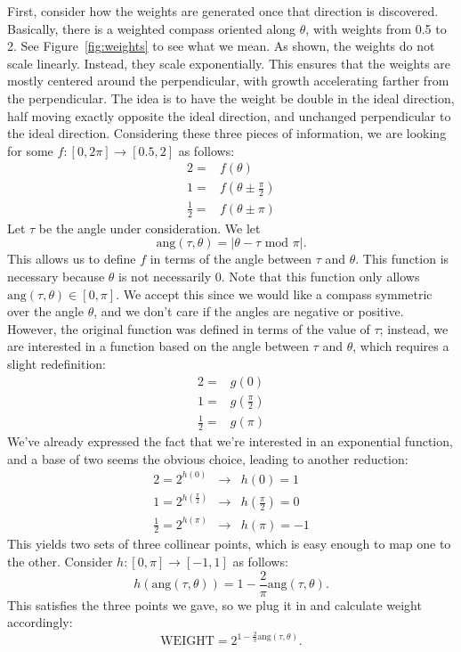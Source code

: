 \documentclass[twocolumn,11pt]{article}
\begin{document}
First, consider how the weights are generated once
that direction is discovered. Basically, there is a weighted compass oriented
along $\theta$, with weights from 0.5 to 2. See Figure~\ref{fig:weights} to
see what we mean. As shown, the weights do not scale linearly. Instead, they
scale exponentially. This ensures that the weights are mostly centered around
the perpendicular, with growth accelerating farther from the perpendicular.
The idea is to have the weight be double in the ideal
direction, half moving exactly opposite the ideal direction, and unchanged
perpendicular to the ideal direction. Considering these three pieces of
information, we are looking for some $f : [0,2\pi] \to [0.5,2]$ as follows:
\begin{align*}
  2 = & f(\theta) \\
  1 = & f(\theta \pm \frac{\pi}{2}) \\
  \frac{1}{2} = & f(\theta \pm \pi)
\end{align*}
Let $\tau$ be the angle under consideration. We let
\[ \mbox{ang}(\tau, \theta) = |\theta - \tau \mbox{ mod } \pi|. \]
This allows us to define $f$ in terms of the angle between $\tau$ and
$\theta$. This function is necessary because $\theta$ is not necessarily
0. Note that this function only allows $\mbox{ang}(\tau, \theta)
\in [0,\pi]$. We accept this since we would like a compass symmetric
over the angle $\theta$, and we don't care if the angles are negative
or positive. However, the original function was defined in terms of the
value of $\tau$; instead, we are interested in a function based on the
angle between $\tau$ and $\theta$, which requires a slight redefinition:
\begin{align*}
  2 = & g(0) \\
  1 = & g(\frac{\pi}{2}) \\
  \frac{1}{2} = & g(\pi)
\end{align*}
We've already expressed the fact that we're interested in an exponential
function, and a base of two seems the obvious choice, leading to another
reduction:
\begin{align*}
  2 = 2^{h(0)} & \to & h(0) = 1 \\
  1 = 2^{h(\frac{\pi}{2})} & \to & h(\frac{\pi}{2}) = 0\\
  \frac{1}{2} = 2^{h(\pi)} & \to & h(\pi) = -1
\end{align*}
This yields two sets of three collinear points, which is easy enough to
map one to the other. Consider $h : [0,\pi] \to [-1,1]$ as follows:
\[ h(\mbox{ang}(\tau,\theta)) = 1 - \frac{2}{\pi}\mbox{ang}(\tau, \theta). \]
This satisfies the three points we gave, so we plug it in and calculate weight
accordingly:
\begin{equation}
  \mbox{WEIGHT} = 2^{1-\frac{2}{\pi}\mbox{ang}(\tau,\theta)}. \label{eq:weight}
\end{equation}
\end{document}
